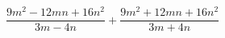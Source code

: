 \begin{ex}[type=expression]
	\begin{condition}
		\( \dfrac{9m^2-12mn+16n^2}{3m-4n}+\dfrac{9m^2+12mn+16n^2}{3m+4n} \)
	\end{condition}
\end{ex}